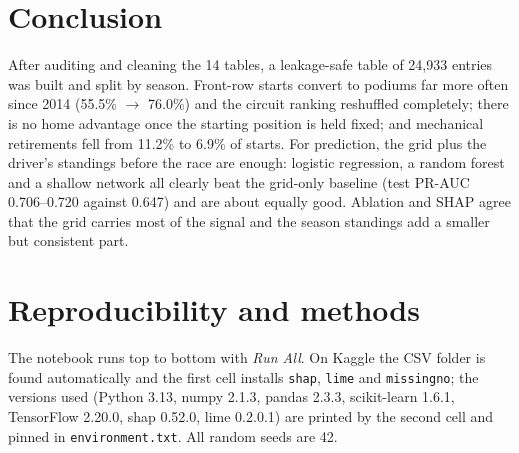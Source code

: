 \documentclass[11pt,a4paper]{article}
\newcommand{\code}[1]{\texttt{#1}}
\begin{document}
\section{Conclusion}
After auditing and cleaning the 14 tables, a leakage-safe table of 24{,}933 entries was built and split by season.
Front-row starts convert to podiums far more often since 2014 (55.5\% $\rightarrow$ 76.0\%) and the circuit ranking reshuffled completely; there is no home advantage once the starting position is held fixed; and mechanical retirements fell from 11.2\% to 6.9\% of starts.
For prediction, the grid plus the driver's standings before the race are enough: logistic regression, a random forest and a shallow network all clearly beat the grid-only baseline (test PR-AUC 0.706--0.720 against 0.647) and are about equally good. Ablation and SHAP agree that the grid carries most of the signal and the season standings add a smaller but consistent part.




\appendix
\section{Reproducibility and methods}
The notebook runs top to bottom with \textit{Run All}. On Kaggle the CSV folder is found automatically and the first cell installs \code{shap}, \code{lime} and \code{missingno}; the versions used (Python 3.13, numpy 2.1.3, pandas 2.3.3, scikit-learn 1.6.1, TensorFlow 2.20.0, shap 0.52.0, lime 0.2.0.1) are printed by the second cell and pinned in \code{environment.txt}. All random seeds are 42.
\end{document}
